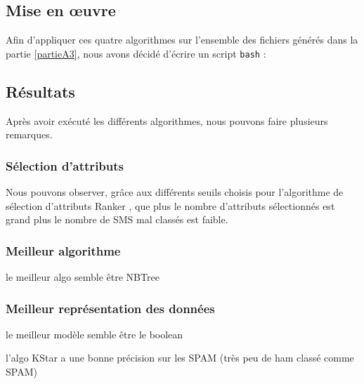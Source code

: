 \subsection{Mise en œuvre}
Afin d'appliquer ces quatre algorithmes sur l'ensemble des fichiers générés dans la partie \vref{partieA3}, nous avons décidé d'écrire un script \texttt{bash} :



\subsection{Résultats}

Après avoir exécuté les différents algorithmes, nous pouvons faire plusieurs remarques.

\subsubsection{Sélection d'attributs}
Nous pouvons observer, grâce aux différents seuils choisis pour l'algorithme de sélection d'attributs \og Ranker \fg{}, que plus le nombre d'attributs sélectionnés est grand plus le nombre de SMS mal classés est faible.

\subsubsection{Meilleur algorithme}
    le meilleur algo semble être NBTree

\subsubsection{Meilleur représentation des données}
    le meilleur modèle semble être le boolean 

    l'algo KStar a une bonne précision sur les SPAM (très peu de ham classé comme SPAM)



